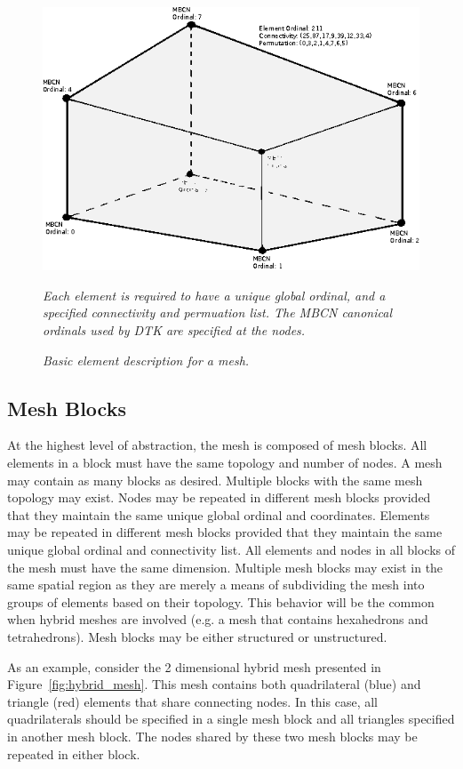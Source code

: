 \documentclass[letterpaper,12pt]{article}
\begin{document}
\begin{figure}[htpb!]
  \centering
  \includegraphics[width=5in]{hex_element.eps}
  \caption{\sl Basic element description for a mesh.}{\sl Each element
    is required to have a unique global ordinal, and a specified
    connectivity and permuation list. The MBCN canonical ordinals used
    by DTK are specified at the nodes.}
  \label{fig:mesh_element}
\end{figure}

\subsection{Mesh Blocks}\label{subsec:blocks}
At the highest level of abstraction, the mesh is composed of mesh
blocks. All elements in a block must have the same topology and number
of nodes. A mesh may contain as many blocks as desired. Multiple
blocks with the same mesh topology may exist. Nodes may be repeated in
different mesh blocks provided that they maintain the same unique
global ordinal and coordinates. Elements may be repeated in different
mesh blocks provided that they maintain the same unique global ordinal
and connectivity list. All elements and nodes in all blocks of the
mesh must have the same dimension. Multiple mesh blocks may exist in
the same spatial region as they are merely a means of subdividing the
mesh into groups of elements based on their topology. This behavior
will be the common when hybrid meshes are involved (e.g. a mesh that
contains hexahedrons and tetrahedrons). Mesh blocks may be either
structured or unstructured.

As an example, consider the 2 dimensional hybrid mesh presented in
Figure~\ref{fig:hybrid_mesh}. This mesh contains both quadrilateral
(blue) and triangle (red) elements that share connecting nodes. In
this case, all quadrilaterals should be specified in a single mesh
block and all triangles specified in another mesh block. The nodes
shared by these two mesh blocks may be repeated in either block.
\end{document}
